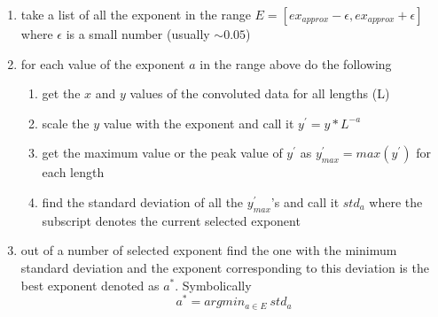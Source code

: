 		\begin{enumerate}
			\item take a list of all the exponent in the range $E = [ex_{approx}-\epsilon, ex_{approx}+\epsilon]$ where $\epsilon$ is a small number (usually $\sim 0.05$)
			\item for each value of the exponent $a$ in the range above do the following
			\begin{enumerate}
				\item get the $x$ and $y$ values of the convoluted data for all lengths (L)
				\item scale the $y$ value with the exponent and call it $y^{\prime} = y*L^{-a}$
				\item get the maximum value or the peak value of $y^{\prime}$ as $y^{\prime}_{max}=max(y^{\prime})$ for each length

				\item find the standard deviation of all the $y^{\prime}_{max}$'s and call it $std_{a}$ where the subscript denotes the current selected exponent
			\end{enumerate}
			\item out of a number of selected exponent find the one with the minimum standard deviation and the exponent corresponding to this deviation is the best exponent denoted as $a^*$. Symbolically
			\begin{equation}
				a^* = argmin_{a \in E}\ std_{a}
			\end{equation}
		\end{enumerate}
